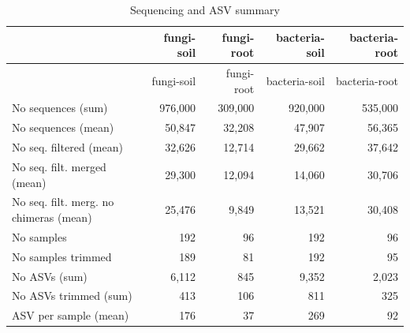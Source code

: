 \documentclass[11pt,]{article}
\begin{document}
\begin{longtable}[]{@{}lrrrr@{}}
\caption{Sequencing and ASV summary}\tabularnewline
\toprule
& fungi-soil & fungi-root & bacteria-soil & bacteria-root\tabularnewline
\midrule
\endfirsthead
\toprule
& fungi-soil & fungi-root & bacteria-soil & bacteria-root\tabularnewline
\midrule
\endhead
No sequences (sum) & 976,000 & 309,000 & 920,000 &
535,000\tabularnewline
No sequences (mean) & 50,847 & 32,208 & 47,907 & 56,365\tabularnewline
No seq. filtered (mean) & 32,626 & 12,714 & 29,662 &
37,642\tabularnewline
No seq. filt. merged (mean) & 29,300 & 12,094 & 14,060 &
30,706\tabularnewline
No seq. filt. merg. no chimeras (mean) & 25,476 & 9,849 & 13,521 &
30,408\tabularnewline
No samples & 192 & 96 & 192 & 96\tabularnewline
No samples trimmed & 189 & 81 & 192 & 95\tabularnewline
No ASVs (sum) & 6,112 & 845 & 9,352 & 2,023\tabularnewline
No ASVs trimmed (sum) & 413 & 106 & 811 & 325\tabularnewline
ASV per sample (mean) & 176 & 37 & 269 & 92\tabularnewline
\bottomrule
\end{longtable}
\end{document}

